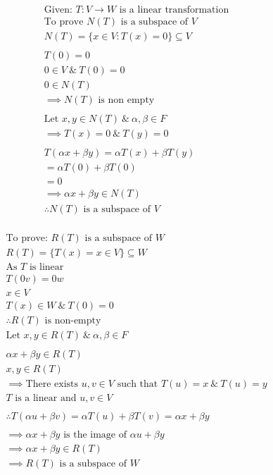 \documentclass[english,course,fleqn]{lecture}
\newenvironment{qanda}{\setlength{\parindent}{0pt}}{\bigskip}
\begin{document}
\begin{qanda}
  \begin{gather*}
    \text{Given: } T:V\rightarrow W \text{ is a linear transformation}\\
    \text{To prove $N(T)$ is a subspace of $V$}\\
    N(T) = \{x \in V:T(x) = 0\} \subseteq V\\
    \\
    T(0) = 0\\
    0 \in V ~\&~ T(0) = 0\\
    0 \in N(T)\\
    \implies N(T) \text{ is non empty}\\
    \\
    \text{Let }x,y \in N(T) ~\&~ \alpha, \beta \in F\\
    \implies T(x) = 0 ~\&~ T(y) = 0\\
    \\
    T(\alpha x + \beta y) = \alpha T(x) + \beta T(y)\\
    = \alpha T(0) + \beta T(0)\\
    = 0\\
    \implies \alpha x + \beta y \in N(T)\\
    \therefore N(T) \text{ is a subspace of $V$}\\
  \end{gather*}

  \begin{gather*}
    \text{To prove: $R(T)$ is a subspace of $W$}\\
    R(T) = \{T(x) = x \in V\} \subseteq W\\
    \text{As $T$ is linear}\\
    T(0v) = 0w\\
    x \in V\\
    T(x) \in W ~\&~ T(0) = 0\\
  \therefore R(T) \text{ is non-empty}\\
    \text{Let }x,y \in R(T) ~\&~ \alpha, \beta \in F \\
    \\
    \alpha x + \beta y \in R(T)\\
    x,y \in R(T)\\
    \implies \text{There exists $u,v \in V$ such that $T(u) = x ~\&~ T(u) = y$}\\
    \text{$T$ is a linear and $u,v \in V$}\\
    \\
    \therefore T(\alpha u + \beta v) = \alpha T(u) + \beta T(v) = \alpha x + \beta y\\ 
    \\
    \implies \alpha x + \beta y \text{ is the image of $\alpha u + \beta y$}\\
    \implies \alpha x + \beta y \in R(T)\\
    \implies R(T) \text{ is a subspace of $W$}
  \end{gather*}

\end{qanda}
\end{document}
